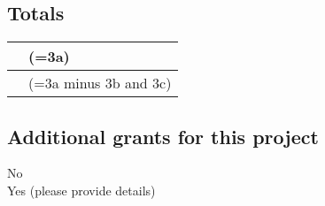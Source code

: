 \subsection{Totals}\label{sec:totals}

\begin{tabular}{|w{3.6cm}|p{11.54cm}|}
    \hline
     & (=3a)\\
    \hline
     & (=3a minus 3b and 3c)\\
    \hline
\end{tabular}


\subsection{Additional grants for this project}\label{sec:addapp}


\checkedbox No\\
\checkbox Yes (please provide details)\\

